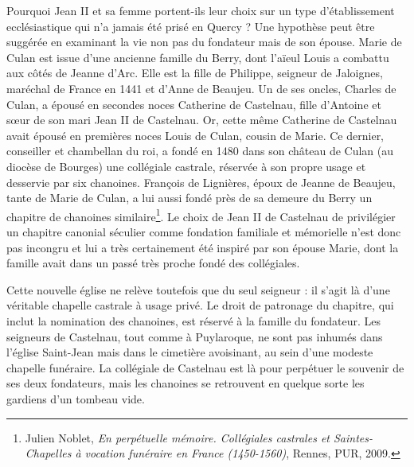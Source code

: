 \documentclass[12pt,twoside,openany]{book}
\begin{document}
Pourquoi Jean II et sa femme portent-ils leur choix sur un type d’établissement ecclésiastique qui n’a jamais été prisé en Quercy ? Une hypothèse peut être suggérée en examinant la vie non pas du fondateur mais de son épouse. Marie de Culan est issue d’une ancienne famille du Berry, dont l’aïeul Louis a combattu aux côtés de Jeanne d’Arc. Elle est la fille de Philippe, seigneur de Jaloignes, maréchal de France en 1441 et d’Anne de Beaujeu. Un de ses oncles, Charles de Culan, a épousé en secondes noces Catherine de Castelnau, fille d’Antoine et sœur de son mari Jean II de Castelnau. Or, cette même Catherine de Castelnau avait épousé en premières noces Louis de Culan, cousin de Marie. Ce dernier, conseiller et chambellan du roi, a fondé en 1480 dans son château de Culan (au diocèse de Bourges) une collégiale castrale, réservée à son propre usage et desservie par six chanoines. François de Lignières, époux de Jeanne de Beaujeu, tante de Marie de Culan, a lui aussi fondé près de sa demeure du Berry un chapitre de chanoines similaire\footnote{Julien Noblet, \textit{En perpétuelle mémoire. Collégiales castrales et Saintes-Chapelles à vocation funéraire en France (1450-1560)}, Rennes, PUR, 2009.}. Le choix de Jean II de Castelnau de privilégier un chapitre canonial séculier comme fondation familiale et mémorielle n’est donc pas incongru et lui a très certainement été inspiré par son épouse Marie, dont la famille avait dans un passé très proche fondé des collégiales.

Cette nouvelle église ne relève toutefois que du seul seigneur : il s’agit là d’une véritable chapelle castrale à usage privé. Le droit de patronage du chapitre, qui inclut la nomination des chanoines, est réservé à la famille du fondateur. Les seigneurs de Castelnau, tout comme à Puylaroque, ne sont pas inhumés dans l’église Saint-Jean mais dans le cimetière avoisinant, au sein d’une modeste chapelle funéraire. La collégiale de Castelnau est là pour perpétuer le souvenir de ses deux fondateurs, mais les chanoines se retrouvent en quelque sorte les gardiens d’un tombeau vide.
\end{document}
